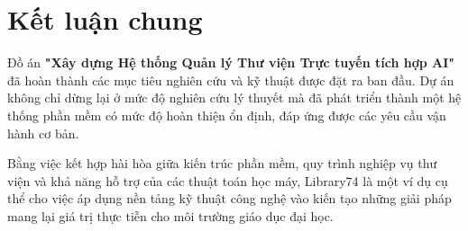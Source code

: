 \section{Kết luận chung}

Đồ án \textbf{"Xây dựng Hệ thống Quản lý Thư viện Trực tuyến tích hợp AI"} đã hoàn thành các mục tiêu nghiên cứu và kỹ thuật được đặt ra ban đầu. Dự án không chỉ dừng lại ở mức độ nghiên cứu lý thuyết mà đã phát triển thành một hệ thống phần mềm có mức độ hoàn thiện ổn định, đáp ứng được các yêu cầu vận hành cơ bản.

Bằng việc kết hợp hài hòa giữa kiến trúc phần mềm, quy trình nghiệp vụ thư viện và khả năng hỗ trợ của các thuật toán học máy, Library74 là một ví dụ cụ thể cho việc áp dụng nền tảng kỹ thuật công nghệ vào kiến tạo những giải pháp mang lại giá trị thực tiễn cho môi trường giáo dục đại học.
